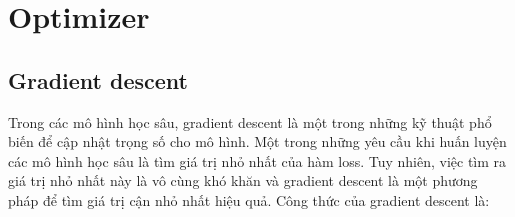 \section{Optimizer}
\subsection{Gradient descent}
Trong các mô hình học sâu, gradient descent là một trong những kỹ thuật phổ biến để cập nhật trọng số cho mô hình. Một trong những yêu cầu khi huấn luyện các mô hình học sâu là tìm giá trị nhỏ nhất của hàm loss. Tuy nhiên, việc tìm ra giá trị nhỏ nhất này là vô cùng khó khăn và gradient descent là một phương pháp để tìm giá trị cận nhỏ nhất hiệu quả. Công thức của gradient descent là:
